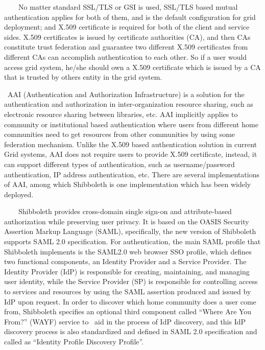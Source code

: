 \documentclass[a4paper]{article}
\begin{document}
{\color{black}
\ \ \ \ No matter standard SSL/TLS or GSI is used, SSL/TLS based mutual
authentication applies for both of them, and is the default
configuration for grid deployment; and X.509 certificate is required
for both of the client and service sides. X.509 certificates is issued
by certificate authorities (CA), and then CAs constitute trust
federation and guarantee two different X.509 certificates from
different CAs can accomplish authentication to each other. So if a user
would access grid system, he/she should own a X.509 certificate which
is issued by a CA that is trusted by other{\textquotesingle}s entity in
the grid system.}

{\upshape\color{black}
\ AAI (Authentication and Authorization Infrastructure) is a solution
for the authentication and authorization in inter-organization resource
sharing, such as electronic resource sharing between libraries, etc.
AAI implicitly applies to community or institutional based
authentication where users from different home communities need to get
resources from other communities by using some federation mechanism.
Unlike the X.509 based authentication solution in current Grid systems,
AAI does not require users to provide X.509 certificate, instead, it
can support different types of authentication, such as
username/password authentication, IP address authentication, etc. There
are several implementations of AAI, among which Shibboleth is one
implementation which has been widely deployed.}

{\upshape\color{black}
\ \ \ \ Shibboleth provides cross-domain single sign-on and
attribute-based authorization while preserving user privacy. It is
based on the OASIS Security Assertion Markup Language (SAML),
specifically, the new version of Shibboleth supports SAML 2.0
specification. For authentication, the main SAML profile that
Shibboleth implements is the SAML2.0 web browser SSO profile, which
defines two functional components, an Identity Provider and a Service
Provider. The Identity Provider (IdP) is responsible for creating,
maintaining, and managing user identity, while the Service Provider
(SP) is responsible for controlling access to services and resources by
using the SAML assertion produced and issued by IdP upon request. In
order to discover which home community does a user come from,
Shibboleth specifies an optional third component called
{\textquotedblleft}Where Are You From?{\textquotedblright} (WAYF)
service to \ aid in the process of IdP discovery, and this IdP
discovery process is also standardized and defined in SAML 2.0
specification and called as {\textquotedblleft}Identity Profile
Discovery Profile{\textquotedblright}.}
\end{document}
